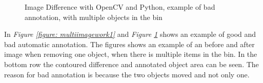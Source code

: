 \begin{figure}[ht]
    \centering
    \hspace{0.5cm}
    \hspace{0.5cm}
    \hspace{0.5cm}
    \caption{Image Difference with OpenCV and Python, example of bad annotation, with multiple objects in the bin}
    \label{figure: multiimagework2}
\end{figure}

In \textit{Figure \ref{figure: multiimagework1}} and \textit{Figure \ref{figure: multiimagework2}} shows an example of good and bad automatic annotation. The figures shows an example of an before and after image when removing one object, when there is multiple items in the bin. In the bottom row the contoured difference and annotated object area can be seen. The reason for bad annotation is because the two objects moved and not only one.   

